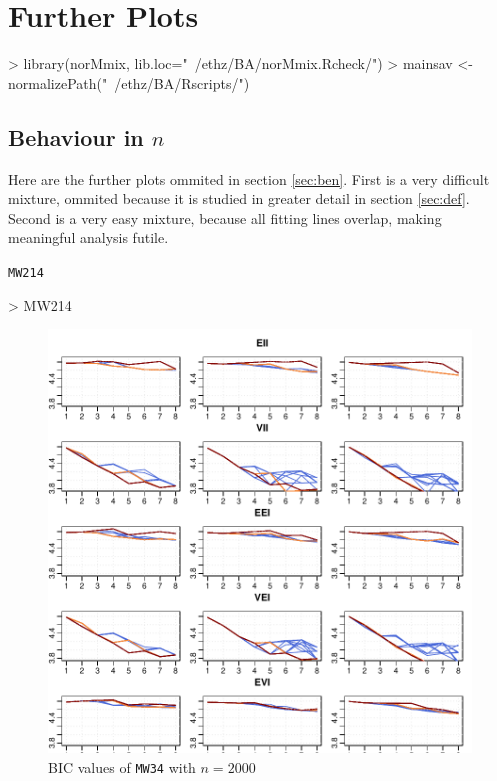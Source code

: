 \chapter{Further Plots}


\begin{Schunk}
\begin{Sinput}
>     library(norMmix, lib.loc="~/ethz/BA/norMmix.Rcheck/")
>     mainsav <- normalizePath("~/ethz/BA/Rscripts/")
\end{Sinput}
\end{Schunk}

\section{Behaviour in $n$}
\label{app:ben}

Here are the further plots ommited in section \ref{sec:ben}.
First is a very difficult mixture, ommited because it is studied in greater 
detail in section \ref{sec:def}. Second is a very easy mixture, because all
fitting lines overlap, making meaningful analysis futile.

{\tt MW214}

\begin{Schunk}
\begin{Sinput}
>     MW214
\end{Sinput}
\end{Schunk}


\begin{figure}[h!]
    \centering
\includegraphics{App_plots-figmw21bicfirst}
    \caption{BIC values of {\tt MW34} with $n=2000$}
    \label{fig:bicmw34first}
\end{figure}

